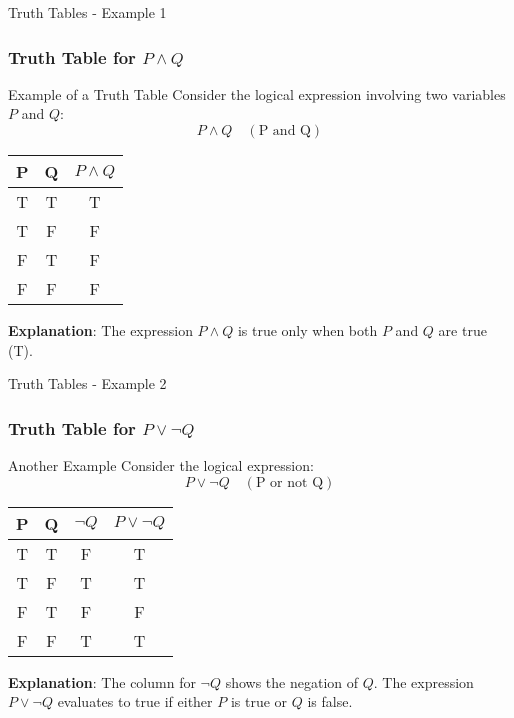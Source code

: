 \documentclass[aspectratio=169]{beamer}
\begin{document}
\begin{frame}[fragile]{Truth Tables - Example 1}
    \frametitle{Truth Table for $P \land Q$}
    
    \begin{block}{Example of a Truth Table}
        Consider the logical expression involving two variables $P$ and $Q$:
        \[
            P \land Q \quad (\text{P and Q})
        \]
        \begin{table}[h]
            \centering
            \begin{tabular}{|c|c|c|}
                \hline
                P & Q & $P \land Q$ \\ 
                \hline
                T & T & T \\ 
                T & F & F \\ 
                F & T & F \\ 
                F & F & F \\ 
                \hline
            \end{tabular}
        \end{table}
        \textbf{Explanation}: The expression $P \land Q$ is true only when both $P$ and $Q$ are true (T).
    \end{block}
\end{frame}

\begin{frame}[fragile]{Truth Tables - Example 2}
    \frametitle{Truth Table for $P \lor \neg Q$}
    
    \begin{block}{Another Example}
        Consider the logical expression:
        \[
            P \lor \neg Q \quad (\text{P or not Q})
        \]
        \begin{table}[h]
            \centering
            \begin{tabular}{|c|c|c|c|}
                \hline
                P & Q & $\neg Q$ & $P \lor \neg Q$ \\ 
                \hline
                T & T & F & T \\ 
                T & F & T & T \\ 
                F & T & F & F \\ 
                F & F & T & T \\ 
                \hline
            \end{tabular}
        \end{table}
        \textbf{Explanation}: The column for $\neg Q$ shows the negation of $Q$. The expression $P \lor \neg Q$ evaluates to true if either $P$ is true or $Q$ is false.
    \end{block}
\end{frame}
\end{document}
